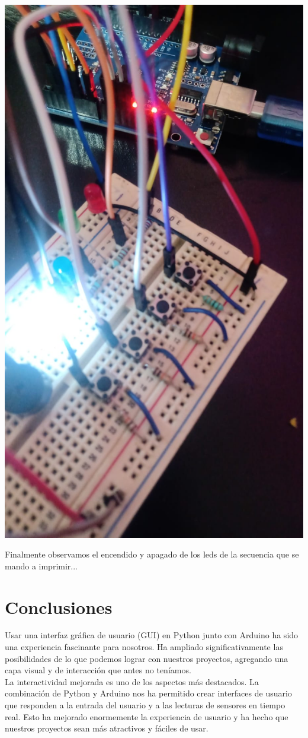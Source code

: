 \documentclass{article}
\begin{document}
{{\newpage


\vspace{0.2cm}
\includegraphics[width=0.5\linewidth]{1371cd04-dfd8-4b58-b8c8-869f93134617.jpg}

\vspace{0.2cm}


{\Large Finalmente observamos el encendido y apagado de los leds de la secuencia que se mando a imprimir...
}

\newpage



\section*{Conclusiones}

{\Large Usar una interfaz gráfica de usuario (GUI) en Python junto con Arduino ha sido una experiencia fascinante para nosotros. Ha ampliado significativamente las posibilidades de lo que podemos lograr con nuestros proyectos, agregando una capa visual y de interacción que antes no teníamos.\\

La interactividad mejorada es uno de los aspectos más destacados. La combinación de Python y Arduino nos ha permitido crear interfaces de usuario que responden a la entrada del usuario y a las lecturas de sensores en tiempo real. Esto ha mejorado enormemente la experiencia de usuario y ha hecho que nuestros proyectos sean más atractivos y fáciles de usar.\\

}}}
\end{document}
